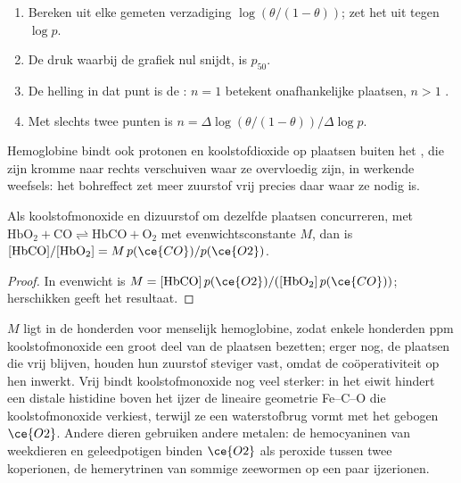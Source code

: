 \begin{method}\label{met:b3:bioinorganic:hill-plot}
\begin{enumerate}
  \item Bereken uit elke gemeten verzadiging $\log(\theta/(1 - \theta))$; zet het uit tegen $\log p$.
  \item De druk waarbij de grafiek nul snijdt, is $p_{50}$.
  \item De helling in dat punt is de : $n = 1$ betekent onafhankelijke
        plaatsen, $n > 1$ .
  \item Met slechts twee punten is $n = \Delta\log(\theta/(1 - \theta))/\Delta\log p$.
\end{enumerate}
\end{method}

Hemoglobine bindt ook protonen en koolstofdioxide op plaatsen buiten het
, die zijn kromme naar rechts verschuiven waar ze overvloedig zijn,
in werkende weefsels: het bohreffect zet meer zuurstof vrij precies daar
waar ze nodig is.

\begin{proposition}\label{prop:b3:bioinorganic:haldane}
Als koolstofmonoxide en dizuurstof om dezelfde plaatsen concurreren, met
$\mathrm{HbO_2 + CO \rightleftharpoons HbCO + O_2}$ met evenwichtsconstante $M$, dan is
$[\mathrm{HbCO}]/[\mathrm{HbO_2}] = M\,p(\ce{CO})/p(\ce{O2})$.
\end{proposition}

\begin{proof}
In evenwicht is $M = [\mathrm{HbCO}]\,p(\ce{O2})/([\mathrm{HbO_2}]\,p(\ce{CO}))$; herschikken geeft het resultaat.
\end{proof}

$M$ ligt in de honderden voor menselijk hemoglobine, zodat enkele honderden
ppm koolstofmonoxide een groot deel van de plaatsen bezetten; erger nog,
de plaatsen die vrij blijven, houden hun zuurstof steviger vast, omdat de
coöperativiteit op hen inwerkt. Vrij  bindt koolstofmonoxide nog
veel sterker: in het eiwit hindert een distale histidine boven het ijzer
de lineaire geometrie Fe--C--O
die koolstofmonoxide verkiest, terwijl ze een waterstofbrug vormt met het gebogen $\ce{O2}$.
Andere dieren gebruiken andere metalen: de hemocyaninen van weekdieren
en geleedpotigen binden $\ce{O2}$ als peroxide tussen twee koperionen, de hemerytrinen van sommige
zeewormen op een paar ijzerionen.

